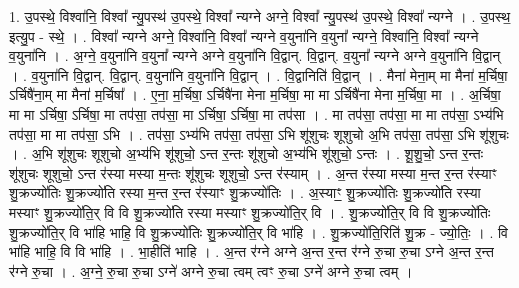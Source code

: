\documentclass[17pt]{extarticle}
\begin{document}
1. उ॒पस्थे॒ विश्वा॑नि॒ विश्वा᳚ न्यु॒पस्थ॑ उ॒पस्थे॒ विश्वा᳚ न्यग्ने अग्ने॒ विश्वा᳚ न्यु॒पस्थ॑ उ॒पस्थे॒ विश्वा᳚ न्यग्ने । . उ॒पस्थ॒ इत्यु॒प - स्थे॒ । . विश्वा᳚ न्यग्ने अग्ने॒ विश्वा॑नि॒ विश्वा᳚ न्यग्ने व॒युना॑नि व॒युना᳚ न्यग्ने॒ विश्वा॑नि॒ विश्वा᳚ न्यग्ने व॒युना॑नि । . अ॒ग्ने॒ व॒युना॑नि व॒युना᳚ न्यग्ने अग्ने व॒युना॑नि वि॒द्वान्. वि॒द्वान्. व॒युना᳚ न्यग्ने अग्ने व॒युना॑नि वि॒द्वान् । . व॒युना॑नि वि॒द्वान्. वि॒द्वान्. व॒युना॑नि व॒युना॑नि वि॒द्वान् । . वि॒द्वानिति॑ वि॒द्वान् । . मैना॑ मेना॒म् मा मैना॑ म॒र्चिषा॒ ऽर्चिषै॑ना॒म् मा मैना॑ म॒र्चिषा᳚ । . ए॒ना॒ म॒र्चिषा॒ ऽर्चिषै॑ना मेना म॒र्चिषा॒ मा मा ऽर्चिषै॑ना मेना म॒र्चिषा॒ मा । . अ॒र्चिषा॒ मा मा ऽर्चिषा॒ ऽर्चिषा॒ मा तप॑सा॒ तप॑सा॒ मा ऽर्चिषा॒ ऽर्चिषा॒ मा तप॑सा । . मा तप॑सा॒ तप॑सा॒ मा मा तप॑सा॒ ऽभ्य॑भि तप॑सा॒ मा मा तप॑सा॒ ऽभि । . तप॑सा॒ ऽभ्य॑भि तप॑सा॒ तप॑सा॒ ऽभि शू॑शुचः शूशुचो अ॒भि तप॑सा॒ तप॑सा॒ ऽभि शू॑शुचः । . अ॒भि शू॑शुचः शूशुचो अ॒भ्य॑भि शू॑शुचो॒ ऽन्त र॒न्तः शू॑शुचो अ॒भ्य॑भि शू॑शुचो॒ ऽन्तः । . शू॒शु॒चो॒ ऽन्त र॒न्तः शू॑शुचः शूशुचो॒ ऽन्त र॑स्या मस्या म॒न्तः शू॑शुचः शूशुचो॒ ऽन्त र॑स्याम् । . अ॒न्त र॑स्या मस्या म॒न्त र॒न्त र॑स्याꣳ शु॒क्रज्यो॑तिः शु॒क्रज्यो॑ति रस्या म॒न्त र॒न्त र॑स्याꣳ शु॒क्रज्यो॑तिः । . अ॒स्याꣳ॒॒ शु॒क्रज्यो॑तिः शु॒क्रज्यो॑ति रस्या मस्याꣳ शु॒क्रज्यो॑ति॒र् वि वि शु॒क्रज्यो॑ति रस्या मस्याꣳ शु॒क्रज्यो॑ति॒र् वि । . शु॒क्रज्यो॑ति॒र् वि वि शु॒क्रज्यो॑तिः शु॒क्रज्यो॑ति॒र् वि भा॑हि भाहि॒ वि शु॒क्रज्यो॑तिः शु॒क्रज्यो॑ति॒र् वि भा॑हि । . शु॒क्रज्यो॑ति॒रिति॑ शु॒क्र - ज्यो॒तिः॒ । . वि भा॑हि भाहि॒ वि वि भा॑हि । . भा॒हीति॑ भाहि । . अ॒न्त र॑ग्ने अग्ने अ॒न्त र॒न्त र॑ग्ने रु॒चा रु॒चा ऽग्ने अ॒न्त र॒न्त र॑ग्ने रु॒चा । . अ॒ग्ने॒ रु॒चा रु॒चा ऽग्ने॑ अग्ने रु॒चा त्वम् त्वꣳ रु॒चा ऽग्ने॑ अग्ने रु॒चा त्वम् । \newline
\end{document}
